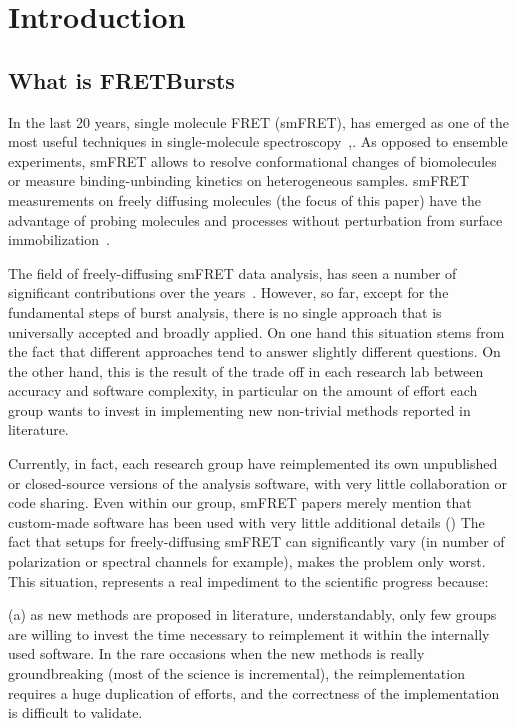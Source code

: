 \section{Introduction}

\subsection{What is FRETBursts}

In the last 20 years, single molecule FRET (smFRET), has emerged as one of the most
useful techniques in single-molecule spectroscopy~\cite{Weiss_1999},\cite{Hohlbein_2014}. 
As opposed to ensemble experiments, smFRET allows to resolve conformational 
changes of biomolecules or measure binding-unbinding kinetics on heterogeneous samples. 
smFRET measurements on freely diffusing molecules (the focus of this paper) have the advantage 
of probing molecules and processes without perturbation from surface immobilization~\cite{Dahan_1999}\cite{Eggeling_1998}. 

The field of freely-diffusing smFRET data analysis, has seen a number of significant 
contributions over the years~\cite{Fries_1998}\cite{Eggeling_2001}\cite{Zhang_2005}\cite{Gopich_2005}\cite{Lee_2005}\cite{Nir_2006}\cite{Antonik2006}\cite{Gopich_2007}\cite{Gopich_2008}\cite{Camley_2009}\cite{Santoso_2010}\cite{Torella_2011}\cite{Tomov_2012}. However, so far, except for the fundamental steps of burst analysis, 
there is no single approach that is universally accepted and broadly applied. 
On one hand this situation stems from the fact that
different approaches tend to answer slightly different questions.
On the other hand, this is the result of the trade off in each research lab
between accuracy and software complexity, in particular on the amount of effort
each group wants to invest in implementing new non-trivial methods reported in literature.

Currently, in fact,
each research group have reimplemented its own unpublished or closed-source versions
of the analysis software, with very little collaboration or code sharing.
Even within our group, smFRET papers merely mention that custom-made software has been
used with very little additional details ()
The fact that setups for freely-diffusing smFRET can significantly 
vary (in number of polarization or spectral channels for example), 
makes the problem only worst.
This situation, represents a real impediment to the scientific progress because:

(a) as new methods are proposed in literature, understandably, only few 
groups are willing to invest the time necessary to reimplement it within 
the internally used software. In the rare occasions when the new methods 
is really groundbreaking (most of the science is incremental), the reimplementation requires 
a huge duplication of efforts, and the correctness of the implementation
is difficult to validate.

